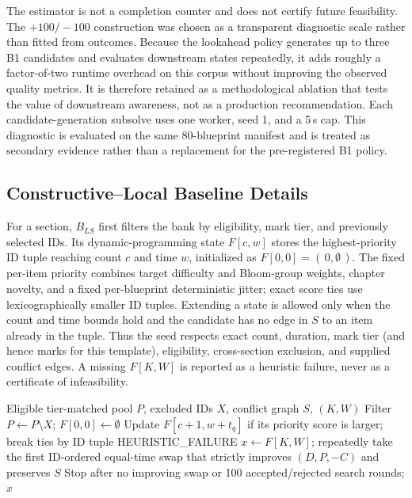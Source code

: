 \documentclass[runningheads]{llncs}
\begin{document}
The estimator is not a completion counter and does not certify future feasibility. The $+100/-100$ construction was chosen as a transparent diagnostic scale rather than fitted from outcomes. Because the lookahead policy generates up to three B1 candidates and evaluates downstream states repeatedly, it adds roughly a factor-of-two runtime overhead on this corpus without improving the observed quality metrics. It is therefore retained as a methodological ablation that tests the value of downstream awareness, not as a production recommendation. Each candidate-generation subsolve uses one worker, seed 1, and a 5\,s cap. This diagnostic is evaluated on the same 80-blueprint manifest and is treated as secondary evidence rather than a replacement for the pre-registered B1 policy.

\subsection{Constructive--Local Baseline Details}
For a section, $B_{LS}$ first filters the bank by eligibility, mark tier, and previously selected IDs. Its dynamic-programming state $F[c,w]$ stores the highest-priority ID tuple reaching count $c$ and time $w$, initialized as $F[0,0]=(\,0,\emptyset\,)$. The fixed per-item priority combines target difficulty and Bloom-group weights, chapter novelty, and a fixed per-blueprint deterministic jitter; exact score ties use lexicographically smaller ID tuples. Extending a state is allowed only when the count and time bounds hold and the candidate has no edge in $S$ to an item already in the tuple. Thus the seed respects exact count, duration, mark tier (and hence marks for this template), eligibility, cross-section exclusion, and supplied conflict edges. A missing $F[K,W]$ is reported as a heuristic failure, never as a certificate of infeasibility.

\begin{algorithm}[t]
\caption{Constructive--local baseline ($B_{LS}$) for one section}
\label{alg:bls}
\begin{algorithmic}[1]
\Require Eligible tier-matched pool $P$, excluded IDs $X$, conflict graph $S$, $(K,W)$
\State Filter $P\gets P\setminus X$; $F[0,0]\gets\emptyset$
      \State Update $F[c+1,w+t_q]$ if its priority score is larger; break ties by ID tuple
    \EndIf
  \EndFor
\EndFor
{} \Return HEURISTIC\_FAILURE \EndIf
\State $x\gets F[K,W]$; repeatedly take the first ID-ordered equal-time swap that strictly improves $(D,P,-C)$ and preserves $S$
\State Stop after no improving swap or 100 accepted/rejected search rounds; \Return $x$
\end{algorithmic}
\end{algorithm}
\end{document}
